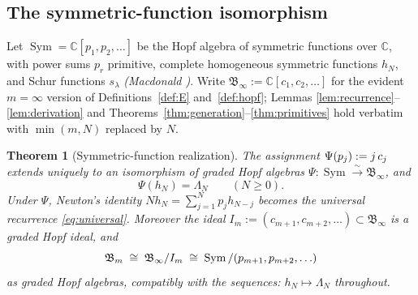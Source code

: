 \documentclass{article}
\newcommand{\assign}{:=}
\newcommand{\tmem}[1]{{\em #1\/}}
\newcommand{\tmop}[1]{\ensuremath{\operatorname{#1}}}
\newtheorem{theorem}{Theorem}
\newcommand{\Sym}{\tmop{Sym}}
\newcommand{\CA}{\mathfrak{B}}
\newcommand{\C}{\mathbb{C}}
\begin{document}
\subsection{The symmetric-function isomorphism}

Let $\Sym = \C [p_1, p_2, \ldots]$ be the Hopf algebra of symmetric functions
over $\C$, with power sums $p_r$ primitive, complete homogeneous symmetric
functions $h_N$, and Schur functions $s_{\lambda}$ {\tmem{(Macdonald
{\cite[Ch.~I]{Macdonald}})}}. Write $\CA_{\infty} \assign \C [c_1, c_2,
\ldots]$ for the evident $m = \infty$ version of Definitions~\ref{def:E}
and~\ref{def:hopf}; Lemmas \ref{lem:recurrence}--\ref{lem:derivation} and
Theorems~\ref{thm:generation}--\ref{thm:primitives} hold verbatim with $\min
(m, N)$ replaced by $N$.

\begin{theorem}
  [Symmetric-function realization]\label{thm:sym} The assignment $\Psi (p_j)
  \assign j \hspace{0.17em} c_j$ extends uniquely to an isomorphism of graded
  Hopf algebras $\Psi : \Sym \xrightarrow{\sim} \CA_{\infty}$, and
  \[ \Psi (h_N) = \Lambda_N  \qquad (N \ge 0) . \]
  Under $\Psi$, Newton's identity $Nh_N = \sum_{j = 1}^N p_j h_{N - j}$
  becomes the universal recurrence \eqref{eq:universal}. Moreover the ideal
  $I_m \assign (c_{m + 1}, c_{m + 2}, \ldots) \subset \CA_{\infty}$ is a
  graded Hopf ideal, and
  \[ \CA_m \hspace{0.27em} \cong \hspace{0.27em} \CA_{\infty} / I_m
     \hspace{0.27em} \cong \hspace{0.27em} \Sym / (p_{m + 1}, p_{m + 2},
     \ldots) \]
  as graded Hopf algebras, compatibly with the sequences: $h_N \mapsto
  \Lambda_N$ throughout.
\end{theorem}
\end{document}
